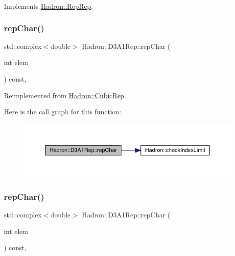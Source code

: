 Implements \mbox{\hyperlink{structHadron_1_1RepRep_ab3213025f6de249f7095892109575fde}{Hadron\+::\+Rep\+Rep}}.

\mbox{\label{structHadron_1_1D3A1Rep_aa169675bc42e174827e727a1f3571227}} 
\subsubsection{\texorpdfstring{repChar()}{repChar()}\hspace{0.1cm}{\footnotesize\ttfamily [1/3]}}
{\footnotesize\ttfamily std\+::complex$<$double$>$ Hadron\+::\+D3\+A1\+Rep\+::rep\+Char (\begin{DoxyParamCaption}\item[{int}]{elem }\end{DoxyParamCaption}) const\hspace{0.3cm}{\ttfamily [inline]}, {\ttfamily [virtual]}}



Reimplemented from \mbox{\hyperlink{structHadron_1_1CubicRep_af45227106e8e715e84b0af69cd3b36f8}{Hadron\+::\+Cubic\+Rep}}.

Here is the call graph for this function\+:
\nopagebreak
\begin{figure}[H]
\begin{center}
\leavevmode
\includegraphics[width=350pt]{d4/df6/structHadron_1_1D3A1Rep_aa169675bc42e174827e727a1f3571227_cgraph}
\end{center}
\end{figure}
\mbox{\label{structHadron_1_1D3A1Rep_aa169675bc42e174827e727a1f3571227}} 
\subsubsection{\texorpdfstring{repChar()}{repChar()}\hspace{0.1cm}{\footnotesize\ttfamily [2/3]}}
{\footnotesize\ttfamily std\+::complex$<$double$>$ Hadron\+::\+D3\+A1\+Rep\+::rep\+Char (\begin{DoxyParamCaption}\item[{int}]{elem }\end{DoxyParamCaption}) const\hspace{0.3cm}{\ttfamily [inline]}, {\ttfamily [virtual]}}



